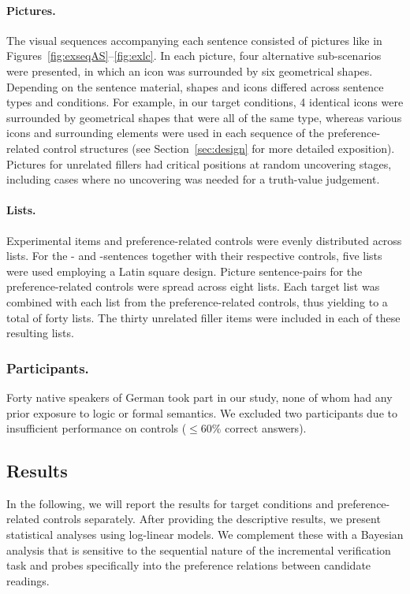 \documentclass[fleqn,reqno,10pt]{article}
\newcommand{\as}{\acro{as}}
\renewcommand{\es}{\acro{es}}
\begin{document}
\paragraph{Pictures.}
The visual sequences accompanying each sentence consisted of pictures
like in Figures~\ref{fig:exseqAS}--\ref{fig:exlc}. In each picture,
four alternative sub-scenarios were presented, in which an icon was
surrounded by six geometrical shapes. Depending on the sentence
material, shapes and icons differed across sentence types and
conditions. For example, in our target conditions, 4 identical icons
were surrounded by geometrical shapes that were all of the same type,
whereas various icons and surrounding elements were used in each
sequence of the preference-related control structures (see
Section~\ref{sec:design} for more detailed exposition). Pictures for
unrelated fillers had critical positions at random uncovering stages,
including cases where no uncovering was needed for a truth-value
judgement.

\paragraph{Lists.}
Experimental items and preference-related controls were evenly
distributed across lists. For the \as- and \es-sentences together with
their respective controls, five lists were used employing a Latin
square design. Picture sentence-pairs for the preference-related
controls were spread across eight lists. Each target list was combined
with each list from the preference-related controls, thus yielding to
a total of forty lists. The thirty unrelated filler items were
included in each of these resulting lists.

\subsubsection{Participants.} 

Forty native speakers of German took part in our study, none of whom
had any prior exposure to logic or formal semantics. We excluded two
participants due to insufficient performance on controls ($\le 60\%$
correct answers).

\subsection{Results}
\label{sec:results}

In the following, we will report the results for target conditions and
preference-related controls separately. After providing the
descriptive results, we present statistical analyses using log-linear
models. We complement these with a Bayesian analysis that is sensitive
to the sequential nature of the incremental verification task and
probes specifically into the preference relations between candidate
readings.
\end{document}
